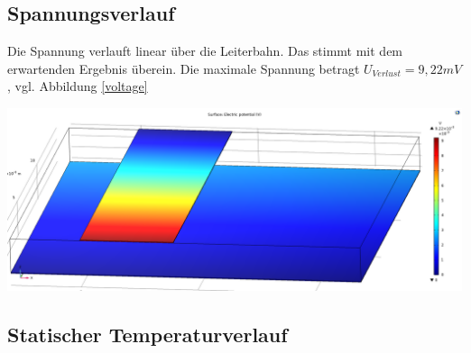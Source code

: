 \documentclass[10pt,a4paper,oneside,abstracton]{scrartcl}
\newenvironment{Figure}
  {\par\medskip\noindent\minipage{\linewidth}}
  {\endminipage\par\medskip}
\begin{document}
\begin{multicols}{2}
\subsection{Spannungsverlauf}
Die Spannung verlauft linear über die Leiterbahn. 
Das stimmt mit dem erwartenden Ergebnis überein. 
Die maximale Spannung betragt $ U_{Verlust} = 9,22mV $, vgl. Abbildung \ref{voltage}

\begin{Figure}
	\includegraphics[width=\textwidth]{Bilder/voltage.png}
	\label{voltage}
\end{Figure}

\subsection{Statischer Temperaturverlauf}


\end{multicols}
\end{document}
